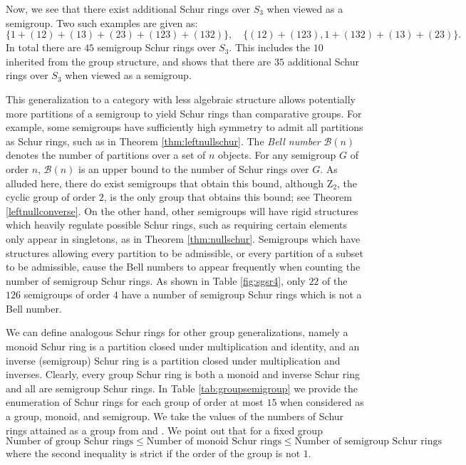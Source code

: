 \documentclass{article}
\theoremstyle{plain}
\theoremstyle{definition}
\newcommand{\thmref}[1]{Theorem \ref{#1}}
\newcommand{\B}{\mathscr{B}}
\newcommand{\z}{\mathrm{Z}}
\begin{document}
Now, we see that there exist additional Schur rings over $S_3$ when viewed as a semigroup. Two such examples are given as:
\[\{1+(12)+(13)+(23)+(123)+(132)\},\quad \{(12)+(123), 1+(132)+(13)+(23)\}. \] In total there are $45$ semigroup Schur rings over $S_3$. This includes the $10$ inherited from the group structure, and shows that there are $35$ additional Schur rings over $S_3$ when viewed as a semigroup.

This generalization to a category with less algebraic structure allows potentially more partitions of a semigroup to yield Schur rings than comparative groups. For example, some semigroups have sufficiently high symmetry to admit all partitions as Schur rings, such as in \thmref{thm:leftnullschur}. The \emph{Bell number} $\B(n)$ denotes the number of partitions over a set of $n$ objects. %
For any semigroup $G$ of order $n$, $\B(n)$ is an upper bound to the number of Schur rings over $G$. As alluded here, there do exist semigroups that obtain this bound, although $\z_2$, the cyclic group of order $2$, is the only group that obtains this bound; see \thmref{leftnullconverse}. On the other hand, other semigroups will have rigid structures which heavily regulate possible Schur rings, such as requiring certain elements only appear in singletons, as in \thmref{thm:nullschur}.  Semigroups which have structures allowing every partition to be admissible, or every partition of a subset to be admissible, cause the Bell numbers to appear frequently when counting the number of semigroup Schur rings. As shown in Table \ref{fig:sgsr4}, only $22$ of the $126$ semigroups of order $4$ have a number of semigroup Schur rings which is not a Bell number. 

We can define analogous Schur rings for other group generalizations, namely a monoid Schur ring is a partition closed under multiplication and identity, and an inverse (semigroup) Schur ring is a partition closed under multiplication and inverses. Clearly, every group Schur ring is both a monoid and inverse Schur ring and all are semigroup Schur rings. In Table \ref{tab:groupsemigroup} we provide the enumeration of Schur rings for each group of order at most $15$ when considered as a group, monoid, and semigroup. We take the values of the numbers of Schur rings attained as a group from \cite{MePhD,Ziv14} and \cite[A384156]{semicount}. We point out that for a fixed group
 \[\text{Number of group Schur rings} \leq \text{Number of monoid Schur rings} \leq \text{Number of semigroup Schur rings}\]
 where the second inequality is strict if the order of the group is not $1$.\label{kl}\label{Cg}
\end{document}
